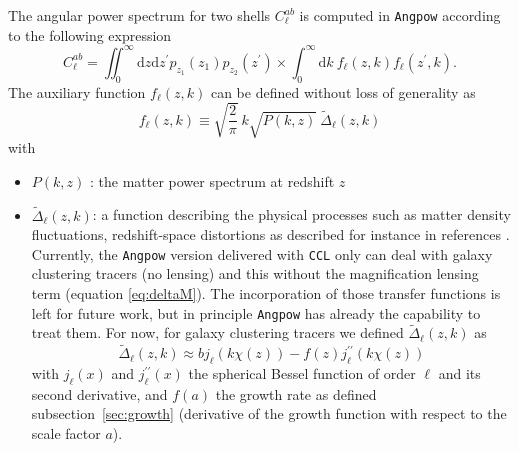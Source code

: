 \documentclass[\docopts]{\docclass}
\newcommand{\ccl}{{\tt CCL}\xspace}
\begin{document}
The angular power spectrum for two shells $C_{\ell}^{ab}$ is computed in \texttt{Angpow} according to the following expression
\begin{equation}
  C_{\ell}^{ab} = \iint_0^\infty \mathrm{d} z \mathrm{d} z^\prime  p_{z_1}(z_1) p_{z_2}(z^\prime) \times \int_0^\infty \mathrm{d} k\ f_{\ell}(z, k) f_{\ell}(z^\prime, k).
  \label{eq-clz1z2-obs}
\end{equation}
The auxiliary function $f_\ell(z,k)$ can be defined without loss of generality as
\begin{equation}
f_\ell(z,k) \equiv  \sqrt{\frac{2}{\pi}}\  k \sqrt{P(k,z)}\ \widetilde{\Delta}_\ell(z,k)\label{eq-fell-func}
\end{equation}
with
\begin{itemize}
\item  $P(k,z)$ : the matter power spectrum at redshift $z$ 
\item $\widetilde{\Delta}_\ell(z,k)$: a function describing the physical processes such as matter density fluctuations, redshift-space distortions as described for instance in references \citet{2008cmb..book.....D,2009PhRvD..80h3514Y,2010PhRvD..82h3508Y, 2011PhRvD..84d3516C,2011PhRvD..84f3505B}. Currently, the \texttt{Angpow} version delivered with \ccl only can deal with galaxy clustering tracers (no lensing) and this without the magnification lensing term (equation \ref{eq:deltaM}). The incorporation of those transfer functions is left for future work, but in principle \texttt{Angpow} has already the capability to treat them. For now, for galaxy clustering tracers we defined $\widetilde{\Delta}_\ell(z,k)$ as 
\begin{equation}
 \widetilde{\Delta}_\ell(z,k) \approx b j_\ell(k \chi(z)) - f(z) j_\ell^{\prime\prime}(k \chi(z)) 
\end{equation}
with $j_\ell(x)$ and $j_\ell^{\prime\prime}(x)$ the spherical Bessel function of order $\ell$ and its second derivative, and $f(a)$ the growth rate as defined subsection~\ref{sec:growth} (derivative of the growth function with respect to the scale factor $a$).
\end{itemize}
\end{document}
